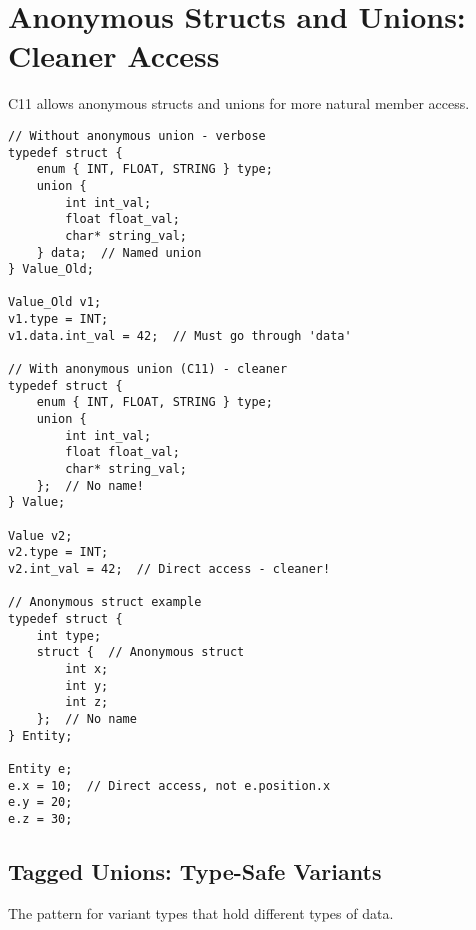 \section{Anonymous Structs and Unions: Cleaner Access}

C11 allows anonymous structs and unions for more natural member access.

\begin{lstlisting}
// Without anonymous union - verbose
typedef struct {
    enum { INT, FLOAT, STRING } type;
    union {
        int int_val;
        float float_val;
        char* string_val;
    } data;  // Named union
} Value_Old;

Value_Old v1;
v1.type = INT;
v1.data.int_val = 42;  // Must go through 'data'

// With anonymous union (C11) - cleaner
typedef struct {
    enum { INT, FLOAT, STRING } type;
    union {
        int int_val;
        float float_val;
        char* string_val;
    };  // No name!
} Value;

Value v2;
v2.type = INT;
v2.int_val = 42;  // Direct access - cleaner!

// Anonymous struct example
typedef struct {
    int type;
    struct {  // Anonymous struct
        int x;
        int y;
        int z;
    };  // No name
} Entity;

Entity e;
e.x = 10;  // Direct access, not e.position.x
e.y = 20;
e.z = 30;
\end{lstlisting}

\subsection{Tagged Unions: Type-Safe Variants}

The pattern for variant types that hold different types of data.

